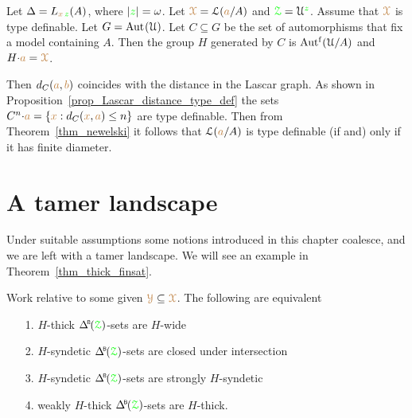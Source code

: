 
\begin{example}\label{ex_newelski}
  Let $\Delta=L_{{\color{brown} x}\,{\color{green} z}}(A)$, where $|{\color{green} z}|=\omega$.
  Let ${\color{brown}\EuScript X}=\EuScript L({\color{brown} a}/A)$ and ${\color{green}\EuScript Z}=\EuScript U^{\color{green} z}$.
  Assume that ${\color{brown}\EuScript X}$ is type definable.
  Let $G={\rm Aut\kern.15ex}(\EuScript U)$.
  Let $C\subseteq G$ be the set of automorphisms that fix a model containing $A$.
  Then the group $H$ generated by $C$ is $\mbox{Aut$^{\rm f}$}(\EuScript U/A)$ and $H{\cdot}{\color{brown} a}={\color{brown}\EuScript X}$.
  
  Then $d_C({\color{brown} a},{\color{brown} b})$ coincides with the distance in the Lascar graph.
  As shown in Proposition~\ref{prop_Lascar_distance_type_def} the sets $C^n{\cdot}{\color{brown} a}=\{{\color{brown} x}:d_C({\color{brown} x},{\color{brown} a})\le n\}$ are type definable.
  Then from Theorem~\ref{thm_newelski} it follows that $\EuScript L({\color{brown} a}/A)$ is type definable (if and) only if it has finite diameter.
\end{example} 

\section{A tamer landscape}\label{tame_landscape}

Under suitable assumptions some notions introduced in this chapter coalesce, and we are left with a tamer landscape.
We will see an example in Theorem~\ref{thm_thick_finsat}.

\begin{theorem}\label{thm_coalesce}
  Work relative to some given ${\color{brown}\EuScript Y}\subseteq{\color{brown}\EuScript X}$.
  The following are equivalent
  \begin{itemize}
    \item[1.] $H$-thick $\BDelta({\grZ})$-sets are $H$-wide
    \item[2.] $H$-syndetic $\BDelta({\grZ})$-sets are closed under intersection 
    \item[3.] $H$-syndetic $\BDelta({\grZ})$-sets are strongly $H$-syndetic
    \item[4.] weakly $H$-thick $\BDelta({\grZ})$-sets are $H$-thick.
  \end{itemize}
\end{theorem}

